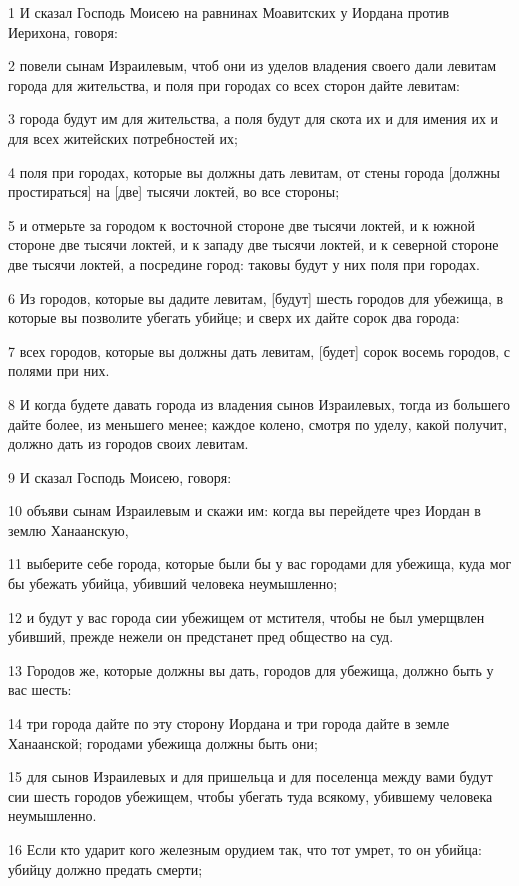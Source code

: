 \par 1 И сказал Господь Моисею на равнинах Моавитских у Иордана против Иерихона, говоря:
\par 2 повели сынам Израилевым, чтоб они из уделов владения своего дали левитам города для жительства, и поля при городах со всех сторон дайте левитам:
\par 3 города будут им для жительства, а поля будут для скота их и для имения их и для всех житейских потребностей их;
\par 4 поля при городах, которые вы должны дать левитам, от стены города [должны простираться] на [две] тысячи локтей, во все стороны;
\par 5 и отмерьте за городом к восточной стороне две тысячи локтей, и к южной стороне две тысячи локтей, и к западу две тысячи локтей, и к северной стороне две тысячи локтей, а посредине город: таковы будут у них поля при городах.
\par 6 Из городов, которые вы дадите левитам, [будут] шесть городов для убежища, в которые вы позволите убегать убийце; и сверх их дайте сорок два города:
\par 7 всех городов, которые вы должны дать левитам, [будет] сорок восемь городов, с полями при них.
\par 8 И когда будете давать города из владения сынов Израилевых, тогда из большего дайте более, из меньшего менее; каждое колено, смотря по уделу, какой получит, должно дать из городов своих левитам.
\par 9 И сказал Господь Моисею, говоря:
\par 10 объяви сынам Израилевым и скажи им: когда вы перейдете чрез Иордан в землю Ханаанскую,
\par 11 выберите себе города, которые были бы у вас городами для убежища, куда мог бы убежать убийца, убивший человека неумышленно;
\par 12 и будут у вас города сии убежищем от мстителя, чтобы не был умерщвлен убивший, прежде нежели он предстанет пред общество на суд.
\par 13 Городов же, которые должны вы дать, городов для убежища, должно быть у вас шесть:
\par 14 три города дайте по эту сторону Иордана и три города дайте в земле Ханаанской; городами убежища должны быть они;
\par 15 для сынов Израилевых и для пришельца и для поселенца между вами будут сии шесть городов убежищем, чтобы убегать туда всякому, убившему человека неумышленно.
\par 16 Если кто ударит кого железным орудием так, что тот умрет, то он убийца: убийцу должно предать смерти;
